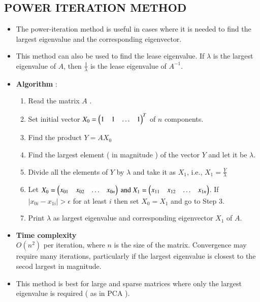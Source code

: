 \documentclass[report,12pt,onecolumn]{IEEEtran}
\theoremstyle{remark}
\begin{document}
\begin{itemize}
		\section{POWER ITERATION METHOD}
		\begin{itemize}
			\item The power-iteration method is useful in cases where it is needed to find the largest eigenvalue and the corresponding eigenvector.
			\item This method can also be used to find the lease eigenvalue. If $\lambda$ is the largest eigenvalue of $A$, then $\frac{1}{\lambda}$ is the lease eigenvalue of $A^{-1}$.
			\item \textbf{Algorithm} :
				\begin{enumerate}
					\item Read the matrix $A$ .
					\item Set initial vector $X_0 = \begin{pmatrix}1 & 1 & \dots &1\end{pmatrix}^T $ of $n$ components.
					\item Find the product $Y = AX_0$
					\item Find the largest element ( in magnitude ) of the vector $Y$ and let it be $\lambda$.
					\item Divide all the elements of $Y$ by $\lambda$ and take it as $X_1$, i.e., $X_1 = \frac{Y}{\lambda}$
					\item Let $X_0 = \begin{pmatrix}x_{01} & x_{02} & \dots & x_{0n}\end{pmatrix} \text{ and } X_1 = \begin{pmatrix}x_{11} & x_{12} & \dots & x_{1n}\end{pmatrix}$. If $|x_{0i} - x_{1i}| > \epsilon $ for at least $i$ then set $X_0 = X_1$ and go to Step 3.
					\item Print $\lambda$ as largest eigenvalue and corresponding eigenvector $X_1$ of $A$.
				\end{enumerate}
			\item \textbf{Time complexity} \\
				$O(n^2)$ per iteration, where $n$ is the size of the matrix. Convergence may require many iterations, particularly if the largest eigenvalue is closest to the secod largest in magnitude.
			\item This method is best for large and sparse matrices where only the largest eigenvalue is required ( as in PCA ).
		\end{itemize}

\end{itemize}
\end{document}
